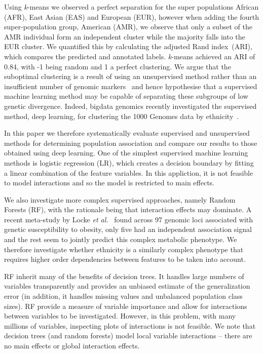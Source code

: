 \documentclass{llncs}
\newcommand{\kMeans}{\textit{k}-means }
\newcommand{\ARI}{adjusted Rand index}
\begin{document}
{Using \kMeans{} we observed a perfect separation for the super populations African (AFR), East Asian (EAS) and European
(EUR), however when adding the fourth super-population group, American (AMR), we observe that only a subset of the AMR
individual form an independent cluster while the majority falls into the EUR cluster.  We quantified this by calculating
the \ARI\ (ARI), which compares the predicted and annotated labels. \kMeans achieved an ARI of 0.84, with -1 being
random and 1 a perfect clustering.  We argue that the suboptimal clustering is a result of using an unsupervised method
rather than an insufficient number of genomic markers~\cite{Patterson2006} and hence hypothesise that a supervised
machine learning method may be capable of separating these subgroups of low genetic divergence.  Indeed, bigdata
genomics recently investigated the supervised method, deep learning, for clustering the 1000 Genomes data by
ethnicity~\cite{Ferguson}.

In this paper we therefore systematically evaluate supervised and unsupervised methods for determining population
association and compare our results to those obtained using deep learning.
One of the simplest supervised machine learning methods is logistic regression (LR), which creates a decision boundary
by fitting a linear combination of the feature variables.  In this appliction, it is not feasible to model interactions and
so the model is restricted to main effects. 

We also investigate more complex supervised
approaches, namely Random Forests (RF), with the rationale being that interaction effects may dominate. A recent meta-study by
Locke {\it et al.}~\cite{Locke2015} found across 97 genomic loci associated with genetic susceptibility to obesity, only five
had an independent association signal and the rest seem to jointly predict this complex metabolic phenotype.  
We therefore investigate whether ethnicity is a similarly complex phenotype that requires higher order dependencies between
features to be taken into account. %

RF inherit many of the benefits of decision trees. It handles large numbers of variables transparently and
provides an unbiased estimate of the generalization error (in addition, it handles missing values and unbalanced
population class sizes). RF provide a measure of variable importance and allow for interactions between
variables to be investigated. However, in this problem, with many millions of variables, inspecting plots of interactions
is not feasible.  We note that decision trees (and random forests) model local variable interactions -- there are 
no main effects or global interaction effects. 

}
\end{document}
